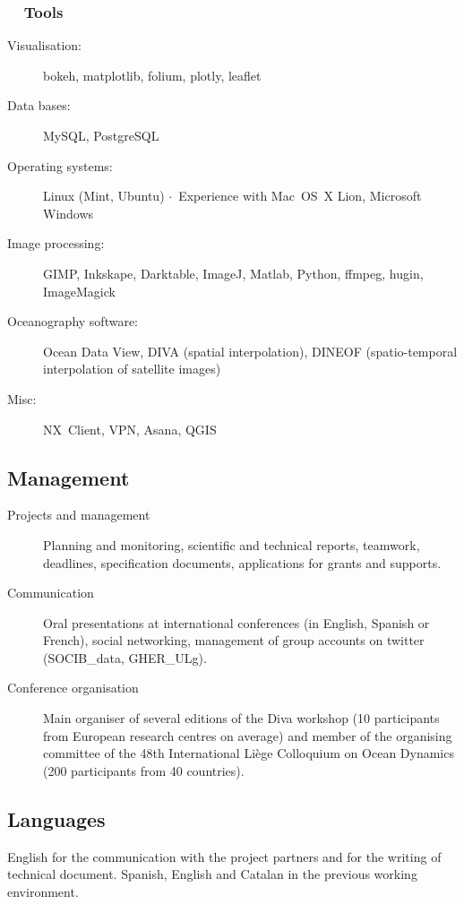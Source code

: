 \documentclass[11pt,a4paper,svgnames]{article}
\newcommand*\circled[1]{\tikz[baseline=(char.base)]{\node[shape=circle,draw,inner sep=2pt] (char) {#1};}}
\newcommand{\sepa}{$\cdot$~}
\begin{document}
\subsubsection*{\circled{\faWrench}~~Tools}

\begin{description}
\item[Visualisation:] bokeh, matplotlib, folium, plotly, leaflet
\item[Data bases:] MySQL, PostgreSQL
\item[Operating systems:] Linux (Mint, Ubuntu) \sepa Experience with Mac~OS~X Lion, Microsoft Windows
\item[Image processing:] GIMP, Inkskape, Darktable, ImageJ, Matlab, Python, ffmpeg, hugin, ImageMagick
\item[Oceanography software:] Ocean Data View, DIVA (spatial interpolation), DINEOF (spatio-temporal interpolation of satellite images)
\item[Misc:] NX~Client, VPN, Asana, QGIS
\end{description}


\subsection{Management}

\begin{description}
\item[Projects and management] {Planning and monitoring, scientific and technical reports, teamwork, deadlines, specification documents, applications for grants and supports.}

\item[Communication] {Oral presentations at international conferences (in English, Spanish or French), social networking, management of group accounts on twitter (SOCIB\_data, GHER\_ULg).}

\item[Conference organisation]{Main organiser of several editions of the Diva workshop (10 participants from European research centres on average) and member of the organising committee of the 48th International Li\`{e}ge Colloquium on Ocean Dynamics (200 participants from 40 countries).}

\end{description}


\subsection{Languages}
\begin{summarybox}
English for the communication with the project partners and for the writing of technical document. Spanish, English and Catalan in the previous working environment.
\end{summarybox}
\end{document}
